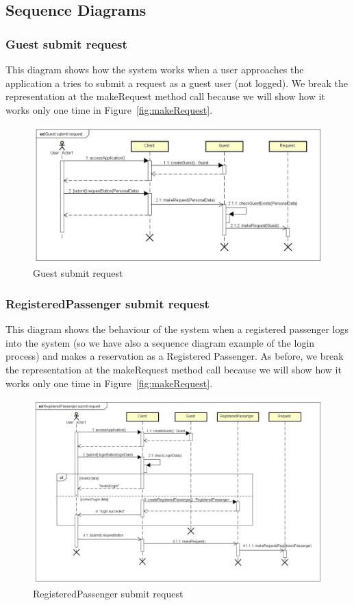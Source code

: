 	\subsection{Sequence Diagrams}
		\subsubsection{Guest submit request}
		This diagram shows how the system works when a user approaches the application a tries to submit
		a request as a guest user (not logged). We break the representation at the makeRequest method call
		because we will show how it works only one time in Figure~\ref{fig:makeRequest}.
		\begin{figure}[h!]
			\begin{center}
				\includegraphics[width=1\linewidth]{../SE2_SD/GuestSubmitRequest}
				\caption{Guest submit request}
			\end{center}
		\end{figure}
		\clearpage
		\subsubsection{RegisteredPassenger submit request}
		This diagram shows the behaviour of the system when a registered passenger logs into the system (so
		we have also a sequence diagram example of the login process) and makes a reservation as a
		Registered Passenger. As before, we break the representation at the makeRequest method call
		because we will show how it works only one time in Figure~\ref{fig:makeRequest}.
		\begin{figure}[h!]
			\begin{center}
				\includegraphics[width=1\linewidth]{../SE2_SD/RegisteredPassengerSubmitRequest}
				\caption{RegisteredPassenger submit request}
			\end{center}
		\end{figure}
		\clearpage
